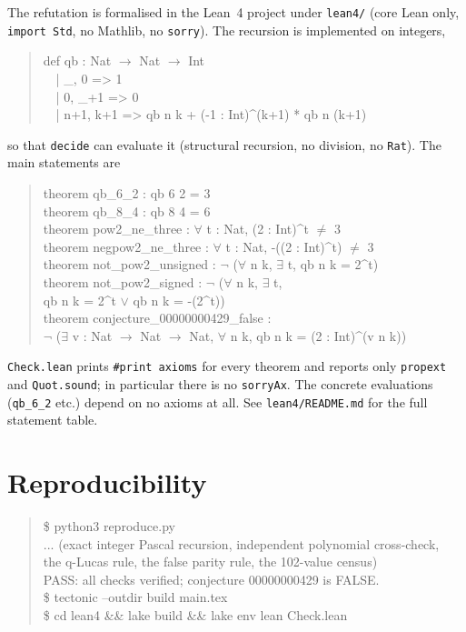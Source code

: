 \documentclass[11pt]{article}
\theoremstyle{definition}
\theoremstyle{remark}
\begin{document}
The refutation is formalised in the Lean~4 project under \texttt{lean4/} (core
Lean only, \texttt{import Std}, no Mathlib, no \texttt{sorry}). The recursion is
implemented on integers,
\begin{quote}\ttfamily
def qb : Nat \(\to\) Nat \(\to\) Int\\
\ \ | \_, 0 => 1\\
\ \ | 0, \_+1 => 0\\
\ \ | n+1, k+1 => qb n k + (-1 : Int)\^{}(k+1) * qb n (k+1)
\end{quote}
so that \texttt{decide} can evaluate it (structural recursion, no division, no
\texttt{Rat}). The main statements are
\begin{quote}\ttfamily
theorem qb\_6\_2 : qb 6 2 = 3\\
theorem qb\_8\_4 : qb 8 4 = 6\\
theorem pow2\_ne\_three : \(\forall\) t : Nat, (2 : Int)\^{}t \(\ne\) 3\\
theorem negpow2\_ne\_three : \(\forall\) t : Nat, -((2 : Int)\^{}t) \(\ne\) 3\\
theorem not\_pow2\_unsigned : \(\neg\) (\(\forall\) n k, \(\exists\) t, qb n k = 2\^{}t)\\
theorem not\_pow2\_signed : \(\neg\) (\(\forall\) n k, \(\exists\) t,\\
\hspace*{2em}qb n k = 2\^{}t \(\lor\) qb n k = -(2\^{}t))\\
theorem conjecture\_00000000429\_false :\\
\hspace*{2em}\(\neg\) (\(\exists\) v : Nat \(\to\) Nat \(\to\) Nat, \(\forall\) n k, qb n k = (2 : Int)\^{}(v n k))
\end{quote}
\texttt{Check.lean} prints \texttt{\#print axioms} for every theorem and
reports only \texttt{propext} and \texttt{Quot.sound}; in particular there is
no \texttt{sorryAx}. The concrete evaluations (\texttt{qb\_6\_2} etc.) depend on
no axioms at all. See \texttt{lean4/README.md} for the full statement table.

\section{Reproducibility}

\begin{quote}\ttfamily
\$ python3 reproduce.py\\
... (exact integer Pascal recursion, independent polynomial cross-check,\\
the q-Lucas rule, the false parity rule, the 102-value census)\\
PASS: all checks verified; conjecture 00000000429 is FALSE.\\
\$ tectonic --outdir build main.tex\\
\$ cd lean4 \&\& lake build \&\& lake env lean Check.lean
\end{quote}
\end{document}
